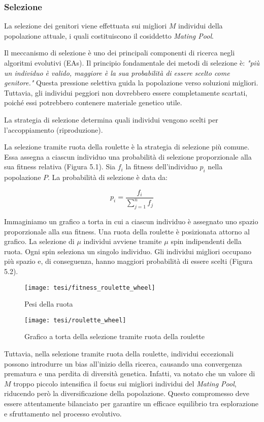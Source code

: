 \subsubsection{Selezione}

La selezione dei genitori viene effettuata sui migliori \( M \) individui della popolazione attuale, i quali costituiscono il cosiddetto \emph{Mating Pool}.

Il meccanismo di selezione è uno dei principali componenti di ricerca negli algoritmi evolutivi (EAs). Il principio fondamentale dei metodi di selezione è: \emph{"più un individuo è valido, maggiore è la sua probabilità di essere scelto come genitore."} Questa pressione selettiva guida la popolazione verso soluzioni migliori. Tuttavia, gli individui peggiori non dovrebbero essere completamente scartati, poiché essi potrebbero contenere materiale genetico utile.

La strategia di selezione determina quali individui vengono scelti per l'accoppiamento (riproduzione).

La selezione tramite ruota della roulette è la strategia di selezione più comune. Essa assegna a ciascun individuo una probabilità di selezione proporzionale alla sua fitness relativa (Figura 5.1). Sia $f_i$ la fitness dell'individuo $p_i$ nella popolazione $P$. La probabilità di selezione è data da:

\[ p_i = \frac{f_i}{\sum_{j=1}^{n} f_j} \]

Immaginiamo un grafico a torta in cui a ciascun individuo è assegnato uno spazio proporzionale alla sua fitness. Una ruota della roulette è posizionata attorno al grafico. La selezione di $\mu$ individui avviene tramite $\mu$ spin indipendenti della ruota. Ogni spin seleziona un singolo individuo. Gli individui migliori occupano più spazio e, di conseguenza, hanno maggiori probabilità di essere scelti (Figura 5.2).

\begin{figure}[!ht] 
    \centering 
    \texttt{[image: tesi/fitness\_roulette\_wheel]} 
    \caption{Pesi della ruota}
\end{figure}

\begin{figure}[!ht] 
    \centering 
    \texttt{[image: tesi/roulette\_wheel]} 
    \caption{Grafico a torta della selezione tramite ruota della roulette}
\end{figure}

Tuttavia, nella selezione tramite ruota della roulette, individui eccezionali possono introdurre un bias all'inizio della ricerca, causando una convergenza prematura e una perdita di diversità genetica. Infatti, va notato che un valore di \( M \) troppo piccolo intensifica il focus sui migliori individui del \emph{Mating Pool}, riducendo però la diversificazione della popolazione. Questo compromesso deve essere attentamente bilanciato per garantire un efficace equilibrio tra esplorazione e sfruttamento nel processo evolutivo.

